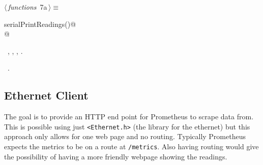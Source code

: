 \documentclass[a4paper, 11pt]{article}
\begin{document}
\begin{flushleft} \small
\begin{minipage}{\linewidth}\label{scrap6}\raggedright\small
{}$\langle\,${\itshape functions}\nobreak\ {\footnotesize{7a}}$\,\rangle\equiv$
\vspace{-1ex}
\begin{list}{}{\setlength{\leftmargin}{1em}} \item
\mbox{}\lstinline@void serialPrintReadings()@\\
\mbox{}@\\
\mbox{}{\NWsep}
\end{list}
\vspace{-1ex}
\vspace{-1ex}
\footnotesize
\begin{list}{}{\setlength{\itemsep}{-\parsep}\setlength{\itemindent}{-\leftmargin}}
\item \NWtxtMacroDefBy\ , , , .
\item \NWtxtMacroRefIn\ .
\end{list}
\end{minipage}
\end{flushleft}

\subsection{Ethernet Client}

The goal is to provide an HTTP end point for Prometheus to scrape data from.
This is possible using just \verb|<Ethernet.h>|
(the library for the ethernet)
but this approach only allows for one web page and no routing.
Typically Prometheus expects the metrics to be on a route at \verb|/metrics|.
Also having routing would give the possibility of having a more friendly webpage showing the readings.
\end{document}
